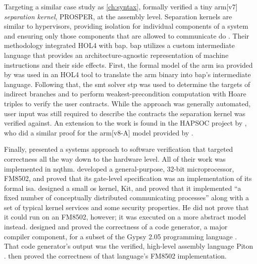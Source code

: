 Targeting a similar case study as \cref{ch:syntax},
\textcite{dam2013hypervisor,dam2013formal}
formally verified a tiny \gls{arm}[v7] \emph{separation kernel},%
PROSPER, at the assembly level.
Separation kernels are similar to hypervisors,
providing isolation for individual components of a system and ensuring
only those components that are allowed to communicate do \autocite{rushby1981dvss}.
Their methodology integrated HOL4 with \ac{bap}.
\Ac{bap} utilizes a custom intermediate language
that provides an architecture-agnostic representation of machine instructions
and their side effects.
First, the formal model of the \gls{arm} \ac{isa} provided by \textcite{fox2010arm} was used
in an HOL4 tool to translate the \gls{arm} binary into \ac{bap}'s intermediate language.
Following that, the \ac{smt} solver \ac{stp}  \autocite{ganesh2007stp}
was used to determine the targets of indirect branches
and to perform weakest-precondition computation with Hoare triples
to verify the user contracts.
While the approach was generally automated,
user input was still required to describe the contracts
the separation kernel was verified against.
An extension to the work is found in the HAPSOC project by \textcite{baumann2016high},
who did a similar proof for the \gls{arm}[v8-A] model provided by \textcite{fox2015improved}.

Finally, \textcite{bevier1989approach} presented a systems approach
to software verification that targeted correctness
all the way down to the hardware level.
All of their work was implemented in \ac{nqthm}.
\Textcite{hunt1989microprocessor} developed a general-purpose, 32-bit microprocessor,
FM8502, and proved that its gate-level specification
was an implementation of its formal \ac{isa}.
\Textcite{bevier1989short,bevier1989kit,bevier1987verified}
designed a small \ac{os} kernel, Kit, and proved that it implemented
``a fixed number of conceptually distributed communicating processes''
along with a set of typical kernel services and some security properties.
He did not prove that it could run on an FM8502, however;
it was executed on a more abstract model instead.
\Textcite{young1989generator} designed and proved the correctness of a code generator,
a major compiler component, for a subset of the Gypsy 2.05 programming language
\autocite{good1986gypsy}. That code generator's output was
the verified, high-level assembly language Piton \autocite{moore1988piton}.
\Textcite{moore1989language} then proved the correctness
of that language's FM8502 implementation.

